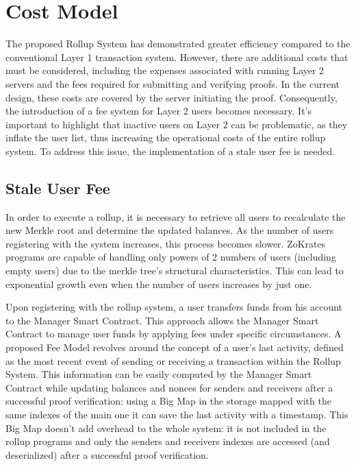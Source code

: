 \section{Cost Model}

The proposed Rollup System has demonstrated greater efficiency compared to the conventional Layer 1 transaction system. However, there are additional costs that must be considered, including the expenses associated with running Layer 2 servers and the fees required for submitting and verifying proofs. In the current design, these costs are covered by the server initiating the proof. Consequently, the introduction of a fee system for Layer 2 users becomes necessary. It's important to highlight that inactive users on Layer 2 can be problematic, as they inflate the user list, thus increasing the operational costs of the entire rollup system. To address this issue, the implementation of a stale user fee is needed.

\subsection{Stale User Fee}

In order to execute a rollup, it is necessary to retrieve all users to recalculate the new Merkle root and determine the updated balances. As the number of users registering with the system increases, this process becomes slower. ZoKrates programs are capable of handling only powers of 2 numbers of users (including empty users) due to the merkle tree's structural characteristics. This can lead to exponential growth even when the number of users increases by just one.

Upon registering with the rollup system, a user transfers funds from his account to the Manager Smart Contract. This approach allows the Manager Smart Contract to manage user funds by applying fees under specific circumstances. A proposed Fee Model revolves around the concept of a user's last activity, defined as the most recent event of sending or receiving a transaction within the Rollup System. This information can be easily computed by the Manager Smart Contract while updating balances and nonces for senders and receivers after a successful proof verification: using a Big Map in the storage mapped with the same indexes of the main one it can save the last activity with a timestamp. This Big Map doesn't add overhead to the whole system: it is not included in the rollup programs and only the senders and receivers indexes are accessed (and deserialized) after a successful proof verification.

